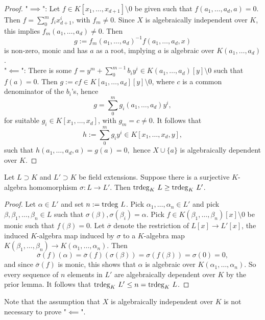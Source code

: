 \begin{proof}
    "$\implies$": Let $f\in K[x_1,\dots,x_{d+1}]\setminus 0$ be given such that $f(a_1,\dots,a_d,a)=0$. Then $f = \sum_0^m f_ix_{d+1}^i$, with $f_m \neq 0$. Since $X$ is algebraically independent over $K$, this implies $f_m(a_1,\dots,a_d)\neq 0$. Then 
    $$g:= f_m(a_1,\dots,a_d)^{-1}f(a_1,\dots,a_d,x)$$
    is non-zero, monic and has $a$ as a root, implying $a$ is algebraic over $K(a_1,\dots,a_d)$.\\
    "$\impliedby$": There is some $f=y^m+\sum_0^{m-1} b_iy^i\in K(a_1,\dots,a_d)[y]\setminus 0$ such that $f(a)=0$. Then $g:=cf\in K[a_1,\dots,a_d][y]\setminus 0$, where $c$ is a common denominator of the $b_i$'s, hence 
    $$g = \sum_0^m g_i(a_1,\dots,a_d)y^{i},$$
    for suitable $g_i\in K[x_1,\dots,x_d]$, with $g_m=c\neq 0$. It follows that 
    $$h := \sum_0^m g_iy^i\in K[x_1,\dots,x_d,y],$$
    such that $h(a_1,\dots,a_d,a)= g(a)=0,$ hence $X\cup \{a\}$ is algebraically dependent over $K$.
\end{proof}
\begin{lemma}\label{SurjectiveHomInducesIneqOfTrdegs}
    Let $L\supset K$ and $L' \supset K$ be field extensions. Suppose there is a surjective $K$-algebra homomorphism $\sigma: L\rightarrow L'$. Then $\trdeg_K\ L \geq \trdeg_K\ L'$.
\end{lemma}
\begin{proof}
    Let $\alpha \in L'$ and set $n:= \mathrm{trdeg } \ L$. Pick $\alpha_1,\dots,\alpha_n\in L'$ and pick $\beta,\beta_1,\dots,\beta_n\in L$ such that $\sigma(\beta),\sigma(\beta_i)=\alpha$. Pick $f\in K(\beta_1,\dots,\beta_n)[x]\setminus 0$ be monic such that $f(\beta)=0$. Let $\overline{\sigma}$ denote the restriction of $L[x]\rightarrow L'[x]$, the induced $K$-algebra map induced by $\sigma$ to a $K$-algebra map $K(\beta_1,\dots,\beta_n)\rightarrow K(\alpha_1,\dots,\alpha_n)$. Then 
    $$\overline{\sigma}(f)(\alpha)=\overline{\sigma}(f)(\sigma(\beta))=\sigma(f(\beta))=\sigma(0)=0,$$
    and since $\overline{\sigma}(f)$ is monic, this shows that $\alpha$ is algebraic over $K(\alpha_1,\dots,\alpha_n)$. So every sequence of $n$ elements in $L'$ are algebraically dependent over $K$ by the prior lemma. It follows that $\mathrm{trdeg }_K \ L' \leq n = \mathrm{trdeg }_K \ L$.
\end{proof}
\begin{remark}\label{ImportantTranscendenceBasisRemark}
    Note that the assumption that $X$ is algebraically independent over $K$ is not necessary to prove "$\impliedby$".
\end{remark}
